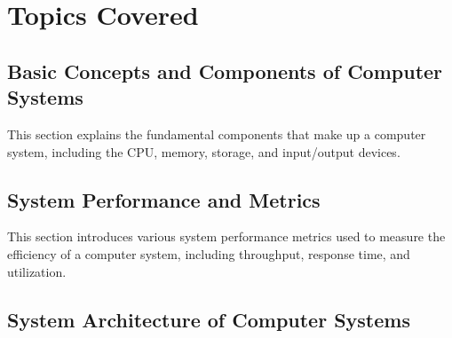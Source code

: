 \documentclass[12pt]{article}
\begin{document}
\section{Topics Covered}

\subsection{Basic Concepts and Components of Computer Systems}
This section explains the fundamental components that make up a computer system, including the CPU, memory, storage, and input/output devices.

\subsection{System Performance and Metrics}
This section introduces various system performance metrics used to measure the efficiency of a computer system, including throughput, response time, and utilization.

\subsection{System Architecture of Computer Systems}
\end{document}
